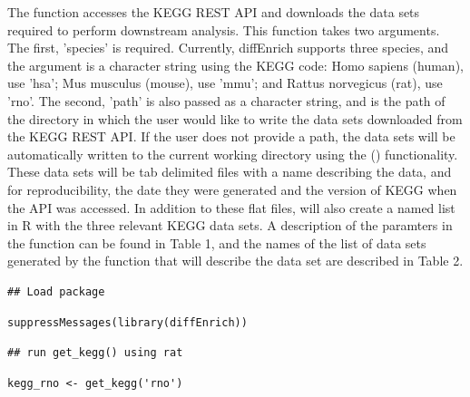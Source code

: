 \documentclass[article]{jss}\usepackage[]{graphicx}\usepackage[]{color}
\makeatletter
\newenvironment{kframe}{%
 \def\at@end@of@kframe{}%
 \ifinner\ifhmode%
  \def\at@end@of@kframe{\end{minipage}}%
  \begin{minipage}{\columnwidth}%
 \fi\fi%
 \def\FrameCommand##1{\hskip\@totalleftmargin \hskip-\fboxsep
 \colorbox{shadecolor}{##1}\hskip-\fboxsep
     \hskip-\linewidth \hskip-\@totalleftmargin \hskip\columnwidth}%
 \MakeFramed {\advance\hsize-\width
   \@totalleftmargin\z@ \linewidth\hsize
   \@setminipage}}%
 {\par\unskip\endMakeFramed%
 \at@end@of@kframe}
\newenvironment{knitrout}{}{} %
\makeatother
\begin{document}
The  function accesses the KEGG REST API and downloads the data
sets required to perform downstream analysis. This function takes two arguments.
The first, 'species' is required. Currently, diffEnrich supports three species,
and the argument is a character string using the KEGG code: Homo sapiens
(human), use 'hsa'; Mus musculus (mouse), use 'mmu'; and Rattus norvegicus
(rat), use 'rno'. The second, 'path' is also passed as a character string, and
is the path of the directory in which the user would like to write the data sets
downloaded from the KEGG REST API. If the user does not provide a path, the data
sets will be automatically written to the current working directory using the
 (\cite{kirill:2017}) functionality. These data sets will be
tab delimited files with a name describing the data, and for reproducibility,
the date they were generated and the version of KEGG when the API was accessed.
In addition to these flat files,  will also create a named list
in R with the three relevant KEGG data sets. A description of the paramters in the
 function can be found in Table 1, and the names of the list of
data sets generated by the function that will describe the data set are described in Table 2.

\begin{knitrout}
\color{fgcolor}\begin{kframe}
\begin{lstlisting}[basicstyle=\ttfamily,breaklines=true]
## Load package\end{lstlisting}
\begin{lstlisting}[basicstyle=\ttfamily,breaklines=true]
suppressMessages(library(diffEnrich))\end{lstlisting}
\begin{lstlisting}[basicstyle=\ttfamily,breaklines=true]
## run get_kegg() using rat\end{lstlisting}
\begin{lstlisting}[basicstyle=\ttfamily,breaklines=true]
kegg_rno <- get_kegg('rno')\end{lstlisting}


{\ttfamily\noindent\itshape\color{messagecolor}{\#\# 3 data sets will be written as tab delimited text files}}

{\ttfamily\noindent\itshape\color{messagecolor}{\#\# File location: /Users/harry/Documents/Saba\_Lab/diffEnrich}}

{\ttfamily\noindent\itshape\color{messagecolor}{\#\# Kegg Release: Release\_94.0+\_04-06\_Apr\_20}}\end{kframe}
\end{knitrout}
\end{document}

